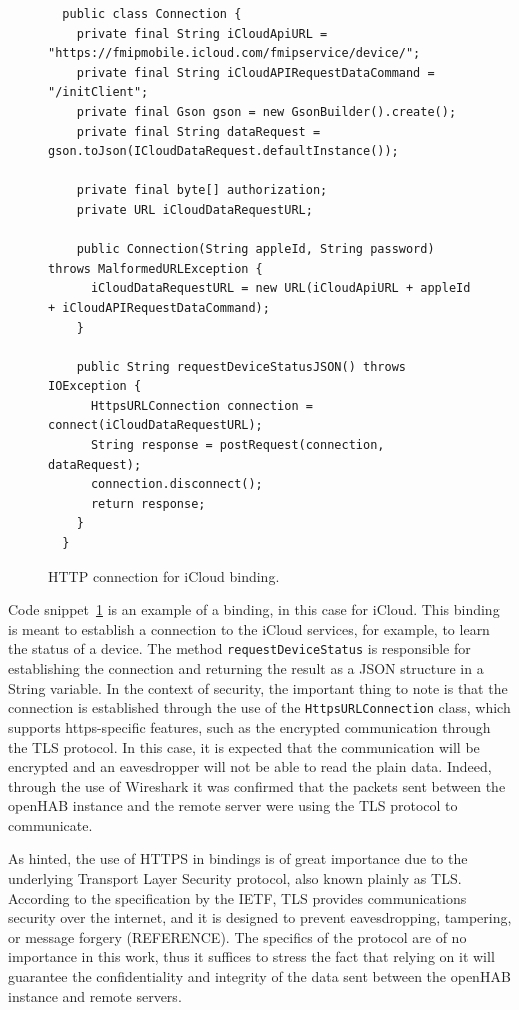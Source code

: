 \documentclass[12pt]{article}
\begin{document}
\begin{figure} [htb]
\begin{lstlisting}
  public class Connection {
    private final String iCloudApiURL = "https://fmipmobile.icloud.com/fmipservice/device/";
    private final String iCloudAPIRequestDataCommand = "/initClient";
    private final Gson gson = new GsonBuilder().create();
    private final String dataRequest = gson.toJson(ICloudDataRequest.defaultInstance());
    
    private final byte[] authorization;
    private URL iCloudDataRequestURL;
    
    public Connection(String appleId, String password) throws MalformedURLException {
      iCloudDataRequestURL = new URL(iCloudApiURL + appleId + iCloudAPIRequestDataCommand);
    } 
    
    public String requestDeviceStatusJSON() throws IOException {
      HttpsURLConnection connection = connect(iCloudDataRequestURL);
      String response = postRequest(connection, dataRequest);
      connection.disconnect();    
      return response;
    }
  }
\end{lstlisting}
\caption{HTTP connection for iCloud binding.}
\label{lst:https_binding}
\end{figure}

Code snippet~\ref{lst:https_binding} is an example of a binding, in this case for iCloud. This binding is meant to establish a connection to the iCloud services, for example, to learn the status of a device. The method \texttt{requestDeviceStatus} is responsible for establishing the connection and returning the result as a JSON structure in a String variable. In the context of security, the important thing to note is that the connection is established through the use of the \texttt{HttpsURLConnection} class, which supports https-specific features, such as the encrypted communication through the TLS protocol. In this case, it is expected that the communication will be encrypted and an eavesdropper will not be able to read the plain data. Indeed, through the use of Wireshark it was confirmed that the packets sent between the openHAB instance and the remote server were using the TLS protocol to communicate.

As hinted, the use of HTTPS in bindings is of great importance due to the underlying Transport Layer Security protocol, also known plainly as TLS. According to the specification by the IETF, TLS provides communications security over the internet, and it is designed to prevent eavesdropping, tampering, or message forgery (REFERENCE). The specifics of the protocol are of no importance in this work, thus it suffices to stress the fact that relying on it will guarantee the confidentiality and integrity of the data sent between the openHAB instance and remote servers.
\end{document}
